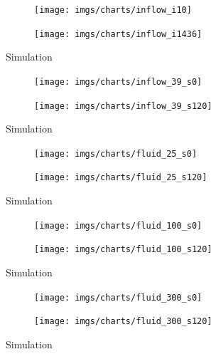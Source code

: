 \documentclass{llncs}
\begin{document}
\begin{figure}
  \begin{subfigure}{.5\textwidth}
    \centering
    \texttt{[image: imgs/charts/inflow\_i10]}
  \end{subfigure}
  \begin{subfigure}{.5\textwidth}
    \centering
    \texttt{[image: imgs/charts/inflow\_i1436]}
  \end{subfigure}

  \begin{center}
    Simulation
  \end{center}

  \begin{subfigure}{.5\textwidth}
    \centering
    \texttt{[image: imgs/charts/inflow\_39\_s0]}
  \end{subfigure}
  \begin{subfigure}{.5\textwidth}
    \centering
    \texttt{[image: imgs/charts/inflow\_39\_s120]}
  \end{subfigure}

  \begin{center}
    Simulation
  \end{center}
  
  \caption{}\label{fig:rec_speed_psnr}
\end{figure}

\begin{figure}
  \begin{subfigure}{.5\textwidth}
    \centering
    \texttt{[image: imgs/charts/fluid\_25\_s0]}
  \end{subfigure}
  \begin{subfigure}{.5\textwidth}
    \centering
    \texttt{[image: imgs/charts/fluid\_25\_s120]}
  \end{subfigure}

  \begin{center}
    Simulation
  \end{center}

  \begin{subfigure}{.5\textwidth}
    \centering
    \texttt{[image: imgs/charts/fluid\_100\_s0]}
  \end{subfigure}
  \begin{subfigure}{.5\textwidth}
    \centering
    \texttt{[image: imgs/charts/fluid\_100\_s120]}
  \end{subfigure}

  \begin{center}
    Simulation
  \end{center}

  \begin{subfigure}{.5\textwidth}
    \centering
    \texttt{[image: imgs/charts/fluid\_300\_s0]}
  \end{subfigure}
  \begin{subfigure}{.5\textwidth}
    \centering
    \texttt{[image: imgs/charts/fluid\_300\_s120]}
  \end{subfigure}

  \begin{center}
    Simulation
  \end{center}
  
  \caption{}\label{fig:rec_fluid_psnr}
\end{figure}
\end{document}
